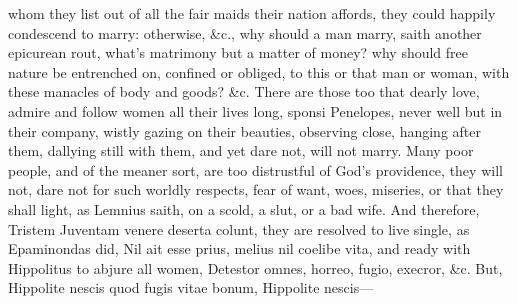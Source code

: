 {whom they list out of all the fair maids their nation affords, they
could happily condescend to marry: otherwise, \&c., why should a man
marry, saith another epicurean rout, what's matrimony but a matter of
money? why should free nature be entrenched on, confined or obliged, to
this or that man or woman, with these manacles of body and goods? \&c.
There are those too that dearly love, admire and follow women all their
lives long, sponsi Penelopes, never well but in their company, wistly
gazing on their beauties, observing close, hanging after them, dallying
still with them, and yet dare not, will not marry. Many poor people,
and of the meaner sort, are too distrustful of God's providence, they
will not, dare not for such worldly respects, fear of want, woes,
miseries, or that they shall light, as Lemnius saith, on a scold,
a slut, or a bad wife. And therefore, Tristem Juventam venere
deserta colunt, they are resolved to live single, as Epaminondas
did, Nil ait esse prius, melius nil coelibe vita, and ready with
Hippolitus to abjure all women, Detestor omnes, horreo, fugio,
execror, \&c. But,
Hippolite nescis quod fugis vitae bonum,
Hippolite nescis---

}
